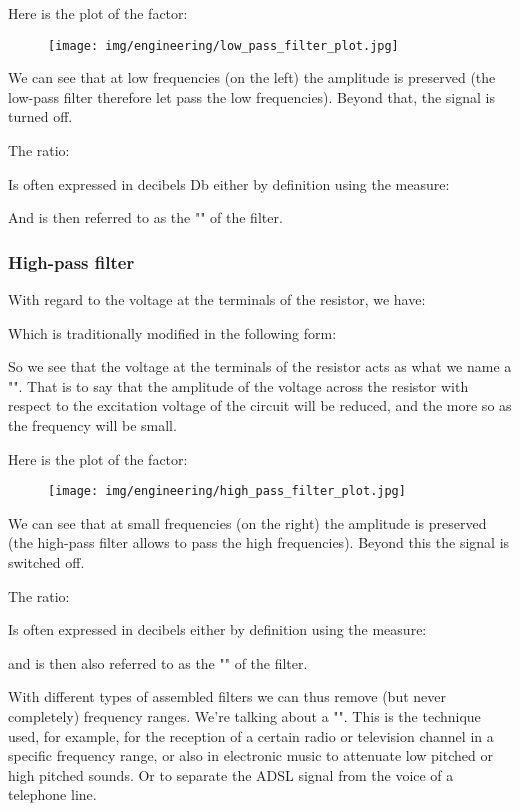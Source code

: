 	Here is the plot of the factor:
	
	\begin{figure}[H]
		\centering
		\texttt{[image: img/engineering/low\_pass\_filter\_plot.jpg]}
	\end{figure}
	We can see that at low frequencies (on the left) the amplitude is preserved (the low-pass filter therefore let pass the low frequencies). Beyond that, the signal is turned off.
	
	The ratio:
	
	Is often expressed in decibels Db either by definition using the measure:
	
	And is then referred to as the "" of the filter.
	
	\subsubsection{High-pass filter}
	With regard to the voltage at the terminals of the resistor, we have:
	
	Which is traditionally modified in the following form:
	
	So we see that the voltage at the terminals of the resistor acts as what we name a "". That is to say that the amplitude of the voltage across the resistor with respect to the excitation voltage of the circuit will be reduced, and the more so as the frequency will be small.

	Here is the plot of the factor:
	
	\begin{figure}[H]
		\centering
		\texttt{[image: img/engineering/high\_pass\_filter\_plot.jpg]}
	\end{figure}
	We can see that at small frequencies (on the right) the amplitude is preserved (the high-pass filter allows to pass the high frequencies). Beyond this the signal is switched off.

	The ratio:
	
	Is often expressed in decibels either by definition using the measure:
	
	and is then also referred to as the "" of the filter.

	With different types of assembled filters we can thus remove (but never completely) frequency ranges. We're talking about a "". This is the technique used, for example, for the reception of a certain radio or television channel in a specific frequency range, or also in electronic music to attenuate low pitched or high pitched sounds. Or to separate the ADSL signal from the voice of a telephone line.

